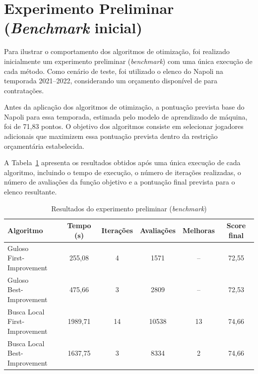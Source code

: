 \section{Experimento Preliminar (\textit{Benchmark} inicial)}

Para ilustrar o comportamento dos algoritmos de otimização, foi realizado inicialmente um experimento preliminar (\textit{benchmark}) com uma única execução de cada método. 
Como cenário de teste, foi utilizado o elenco do Napoli na temporada 2021--2022, considerando um orçamento disponível de  para contratações.

Antes da aplicação dos algoritmos de otimização, a pontuação prevista base do Napoli para 
essa temporada, estimada pelo modelo de aprendizado de máquina, foi de 71,83 pontos. 
O objetivo dos algoritmos consiste em selecionar jogadores adicionais que maximizem 
essa pontuação prevista dentro da restrição orçamentária estabelecida.

A Tabela~\ref{tab:benchmark_inicial} apresenta os resultados obtidos após uma única 
execução de cada algoritmo, incluindo o tempo de execução, 
o número de iterações realizadas, o número de avaliações da função objetivo e a 
pontuação final prevista para o elenco resultante.

\begin{table}[hbt]
\centering
\caption{Resultados do experimento preliminar (\textit{benchmark})}
\label{tab:benchmark_inicial}

\begin{tabular}{lccccc}
\hline
Algoritmo & Tempo (s) & Iterações & Avaliações & Melhoras & Score final \\
\hline
\makecell[l]{Guloso \\ First-Improvement} & 255,08 & 4 & 1571 & -- & 72,55 \\[4pt]
\makecell[l]{Guloso \\ Best-Improvement} & 475,66 & 3 & 2809 & -- & 72,53 \\[6pt]
\makecell[l]{Busca Local \\ First-Improvement} & 1989,71 & 14 & 10538 & 13 & 74,66 \\[4pt]
\makecell[l]{Busca Local \\ Best-Improvement} & 1637,75 & 3 & 8334 & 2 & 74,66 \\
\hline
\end{tabular}

\vspace{.3cm}
\end{table}

